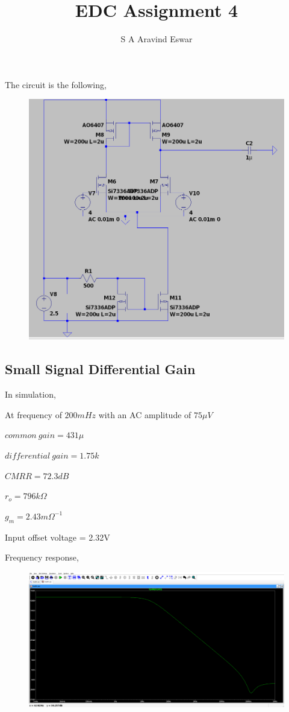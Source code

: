 \documentclass{article}
\title{EDC Assignment 4}
\author{S A Aravind Eswar}
\begin{document}
\maketitle

The circuit is the following,

\begin{figure}[H]
    \centering
    \includegraphics[width=0.75\linewidth]{Differential.jpg}
\end{figure}

\subsection{Small Signal Differential Gain}

In simulation,

At frequency of $200mHz$ with an AC amplitude of $75\mu V$

$common\ gain = 431\mu$

$differential\ gain = 1.75k$

$CMRR = 72.3dB$

$r_o = 796k\Omega$

$g_m = 2.43m\Omega^{-1}$

Input offset voltage = 2.32V

Frequency response,

\begin{figure}[H]
    \centering
    \includegraphics[width=0.75\linewidth]{Frequency.jpg}
\end{figure}
\end{document}
